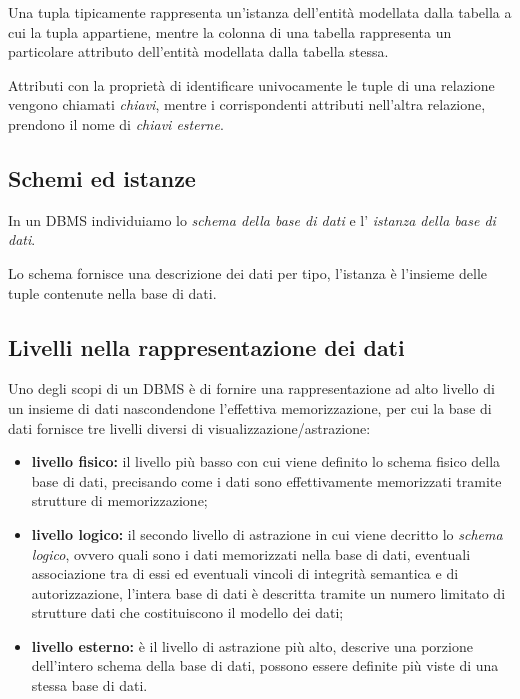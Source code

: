 Una tupla tipicamente rappresenta un'istanza dell'entità modellata dalla tabella
a cui la tupla appartiene, mentre la colonna di una tabella rappresenta un
particolare attributo dell'entità modellata dalla tabella stessa.

Attributi con la proprietà di identificare univocamente le tuple di una
relazione vengono chiamati \textit{chiavi}, mentre i corrispondenti attributi
nell'altra relazione, prendono il nome di \textit{chiavi esterne}.

\subsection{Schemi ed istanze}%
\label{ssub:Schemi ed istanze}
In un DBMS individuiamo lo \textit{schema della base di dati} e l'
\textit{istanza della base di dati}.

Lo schema fornisce una descrizione dei dati per tipo, l'istanza è l'insieme
delle tuple contenute nella base di dati.

\subsection{Livelli nella rappresentazione dei dati}%
\label{ssub:Livelli nella rappresentazione dei dati}
Uno degli scopi di un DBMS è di fornire una rappresentazione ad alto livello di
un insieme di dati nascondendone l'effettiva memorizzazione, per cui la base di
dati fornisce tre livelli diversi di visualizzazione/astrazione:
\begin{itemize}
  \item \textbf{livello fisico:} il livello più basso con cui viene definito lo
    schema fisico della base di dati, precisando come i dati sono effettivamente
    memorizzati tramite strutture di memorizzazione;
  \item \textbf{livello logico:} il secondo livello di astrazione in cui viene
    decritto lo \textit{schema logico}, ovvero quali sono i dati memorizzati
    nella base di dati, eventuali associazione tra di essi ed eventuali vincoli
    di integrità semantica e di autorizzazione, l'intera base di dati è
    descritta tramite un numero limitato di strutture dati che costituiscono il
    modello dei dati;
  \item \textbf{livello esterno:} è il livello di astrazione più alto, descrive
    una porzione dell'intero schema della base di dati, possono essere definite
    più viste di una stessa base di dati.
\end{itemize}

